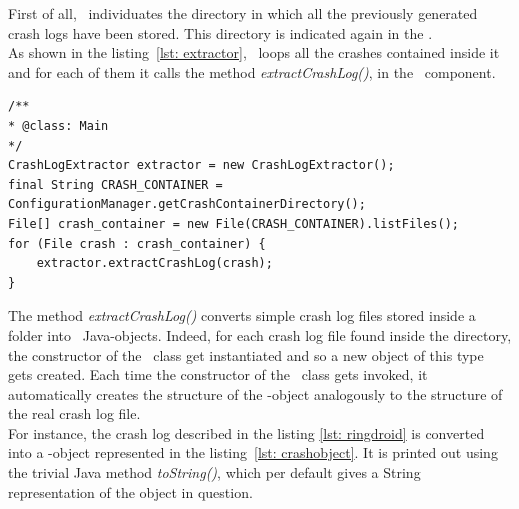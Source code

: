First of all, \toolname\ individuates the directory in which all the previously generated crash logs have been stored. This directory is indicated again in the \Config.\\  
As shown in the listing~\ref{lst: extractor}, \toolname\ loops all the crashes contained inside it and for each of them it calls the method \textit{extractCrashLog()}, in the \Extractor\ component. 

\begin{lstlisting}[caption=\Extractor\ code snippet converting crash files into CrashLog objects,label={lst: extractor}]
/**
* @class: Main
*/
CrashLogExtractor extractor = new CrashLogExtractor();
final String CRASH_CONTAINER = ConfigurationManager.getCrashContainerDirectory();
File[] crash_container = new File(CRASH_CONTAINER).listFiles();
for (File crash : crash_container) {
	extractor.extractCrashLog(crash);
}
\end{lstlisting} 
The method \textit{extractCrashLog()} converts simple crash log files stored inside a folder into \Crash\ Java-objects. 
Indeed, for each crash log file found inside the directory, the constructor of the \Crash\ class get instantiated and so a new object of this type gets created. Each time the constructor of the \Crash\ class gets invoked, it automatically creates the structure of the \Crash-object analogously to the structure of the real crash log file. \\
For instance, the crash log described in the listing \ref{lst: ringdroid} is converted into a \Crash-object represented in the listing~\ref{lst: crashobject}.
It is printed out using the trivial Java method \textit{toString()}, which  per default gives a String representation of the object in question.  

